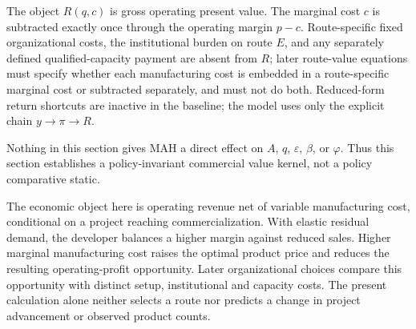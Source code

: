 The object \(R(q,c)\) is gross operating present value. The marginal cost
\(c\) is subtracted exactly once through the operating margin \(p-c\).
Route-specific fixed organizational costs, the institutional burden on route
\(E\), and any separately defined qualified-capacity payment are absent from
\(R\); later route-value equations must specify whether each manufacturing
cost is embedded in a route-specific marginal cost or subtracted separately,
and must not do both. Reduced-form return shortcuts are inactive in the
baseline; the model uses only the explicit chain
\(y\rightarrow\pi\rightarrow R\).

Nothing in this section gives MAH a direct effect on \(A\), \(q\),
\(\varepsilon\), \(\beta\), or \(\varphi\). Thus this section establishes a
policy-invariant commercial value kernel, not a policy comparative static.

The economic object here is operating revenue net of variable manufacturing
cost, conditional on a project reaching commercialization. With elastic
residual demand, the developer balances a higher margin against reduced
sales. Higher marginal manufacturing cost raises the optimal product price
and reduces the resulting operating-profit opportunity. Later organizational
choices compare this opportunity with distinct setup, institutional and
capacity costs. The present calculation alone neither selects a route nor
predicts a change in project advancement or observed product counts.
